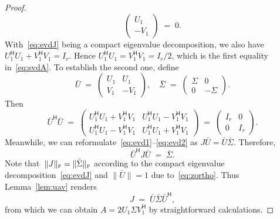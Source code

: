 \documentclass[11pt,a4paper]{article}  %
\numberwithin{equation}{section}
\theoremstyle{definition}
\newcommand{\fro}{{\scriptscriptstyle{\textnormal{F}}}}
\newcommand{\hmt}{{\scriptscriptstyle{{\mathsf{H}}}}}
\begin{document}
\begin{proof}
\begin{equation*}
\begin{pmatrix}
      U_1\\
      -V_1
    \end{pmatrix} \;=\;0.
  \end{equation*}
  With~\eqref{eq:evdJ} being a compact eigenvalue decomposition, we also have~$U_1^\hmt U_1 + V_1^\hmt V_1 = I_r$.
  Hence $U_1^\hmt U_1 = V_1^\hmt V_1= {I_r}/{2}$,
  which is the first equality in~\eqref{eq:svdA}. To establish the second one, define
  \begin{equation*}
    \bar{U}\;=\;
    \begin{pmatrix}
      U_1 & U_1 \\
      V_1 & -V_1
    \end{pmatrix},
    \quad
      \bar{\Sigma} \;=\;
    \begin{pmatrix}
        \Sigma & 0\\
        0&-\Sigma
    \end{pmatrix}.
  \end{equation*}
  Then
  \begin{equation}
    \label{eq:zortho}
    \bar{U}^\hmt \bar{U} \;=\;
    \begin{pmatrix}
      U_1^\hmt U_1 + V_1^\hmt V_1 & U_1^\hmt U_1-V_1^\hmt V_1\\
      U_1^\hmt U_1 - V_1^\hmt V_1 & U_1^\hmt U_1+V_1^\hmt V_1
    \end{pmatrix}
    \;=\;
    \begin{pmatrix}
      I_r & 0\\
      0 & I_r
    \end{pmatrix}.
  \end{equation}
  Meanwhile, we can reformulate~\eqref{eq:evd1}--\eqref{eq:evd2} as $J\bar{U}= \bar{U}\bar{\Sigma}$.
  Therefore,
  \[
  \bar{U}^\hmt J \bar{U} \;=\; \bar{\Sigma}.
  \]
  Note that~$\|J\|_\fro = \|\bar{\Sigma}\|_\fro$ according to the compact eigenvalue
  decomposition~\eqref{eq:evdJ}
  and $\|\bar{U}\|=1$ due to~\eqref{eq:zortho}.
  Thus Lemma~\ref{lem:uav} renders
    \begin{equation}
      \label{eq:jdec}
      J \;=\; \bar{U}\bar{\Sigma}\bar{U}^\hmt,
    \end{equation}
  from which we can obtain $A = 2U_1\Sigma V_1^\hmt$ by straightforward calculations.


\end{proof}
\end{document}
